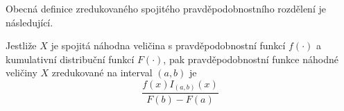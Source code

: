 Obecná definice zredukovaného spojitého pravděpodobnostního rozdělení je následující.

\begin{theorem}
Jestliže $X$ je spojitá náhodna veličina s pravděpodobnostní funkcí $f(\cdot)$ a kumulativní distribuční funkcí $F(\cdot)$, pak pravděpodobnostní funkce náhodné veličiny $X$ zredukované na interval $(a, b)$ je
\begin{equation*}
\frac{f(x)I_{(a, b)}(x)}{F(b) - F(a)}
\end{equation*}
\end{theorem}
